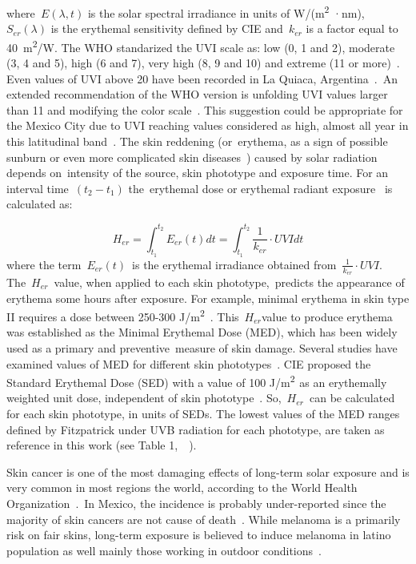 \documentclass{article}
\begin{document}
where\emph{~\(E\left(\lambda,t\right)\)} is the solar spectral irradiance in
units of W/(m\textsuperscript{2} ·nm),~\emph{~\(S_{er}\left(\lambda\right)\)} is the
erythemal sensitivity defined by CIE and~\(k_{er}\) is a factor
equal to 40~m\textsuperscript{2}/W. The WHO standarized the UVI scale
as: low (0, 1 and 2), moderate (3, 4 and 5), high (6 and 7), very high
(8, 9 and 10) and extreme (11 or more)~\cite{2002}. Even values
of UVI above 20 have been recorded in La Quiaca,
Argentina~\cite{Cede_2002}.~An extended recommendation of the WHO
version is unfolding UVI values larger than 11 and modifying the color
scale~\cite{Zaratti_2014}. This suggestion could be appropriate for the
Mexico City due to UVI reaching values considered as high, almost all
year in this latitudinal band~\cite{Tanskanen_2006,Herman_2010}. The skin reddening
(or~erythema, as a sign of possible sunburn or even more complicated
skin diseases~\cite{kukita1974}) caused by solar radiation depends
on~intensity of the source, skin phototype and exposure time. For an
interval time~\((t_2-t_1)\) the~erythemal dose or erythemal radiant
exposure~\cite{Braslavsky_2007} is calculated as:

\begin{equation}
    H_{er}=\int_{t_{1}}^{t_{2}}{E_{er}(t)} dt=\int_{t_{1}}^{t_{2}}{\frac{1}{k_{er}}\cdot UVI} dt
\end{equation}
where the term~\(E_{er}(t)\)~is
the erythemal irradiance obtained from~\(\frac{1}{k_{er}}\cdot UVI\).
The~\(H_{er}\)~value, when applied to each skin
phototype,~predicts the appearance of erythema some hours after
exposure. For example, minimal erythema in skin type II requires a dose
between 250-300 J/m\textsuperscript{2}~\cite{Fitzpatrick1988,Molina_2010,Perez2014,Serrano_2017,Lehmann_2019}.
This~\(H_{er}\)value to produce erythema was established as the
Minimal Erythemal Dose (MED), which has been widely used as a primary
and preventive~measure of skin damage. Several studies have examined
values of MED for different skin phototypes~\cite{MacKie_2000,Meinhardt2008,Miller2012}. CIE
proposed the Standard Erythemal Dose (SED) with a value of 100
J/m\textsuperscript{2~}as an erythemally weighted unit dose, independent
of skin phototype~\cite{organization2014}. So,~\(H_{er}\)~can be
calculated for each skin phototype, in units of SEDs. The lowest values
of the MED ranges defined by Fitzpatrick under UVB radiation for each
phototype, are taken as reference in this work (see Table
1,~~\cite{Fitzpatrick1988}).

Skin cancer is one of the most damaging effects of long-term solar
exposure and is very common in most regions the world, according to the
World Health Organization~\cite{2002}.~In Mexico, the incidence
is probably under-reported since the majority of skin cancers are not
cause of death~\cite{jm2011}. While melanoma is a primarily risk on
fair skins, long-term exposure is believed to induce melanoma in latino
population as well mainly those working in outdoor
conditions~\cite{Rouhani_2008}.
\end{document}
